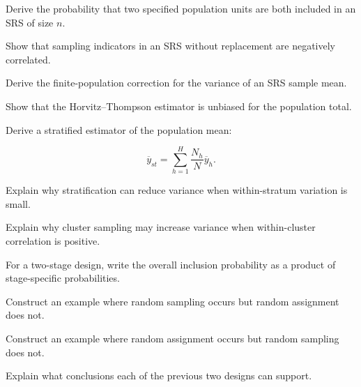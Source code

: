 \begin{exercise}[3]
Derive the probability that two specified population units are both
included in an SRS of size \(n\).
\end{exercise}

\begin{exercise}[3]
Show that sampling indicators in an SRS without replacement are
negatively correlated.
\end{exercise}

\begin{exercise}[3]
Derive the finite-population correction for the variance of an SRS sample
mean.
\end{exercise}

\begin{exercise}[3]
Show that the Horvitz--Thompson estimator is unbiased for the population
total.
\end{exercise}

\begin{exercise}[3]
Derive a stratified estimator of the population mean:

\[
\overline{y}_{st}
=
\sum_{h=1}^{H}
\frac{N_h}{N}
\overline{y}_h.
\]
\end{exercise}

\begin{exercise}[3]
Explain why stratification can reduce variance when within-stratum
variation is small.
\end{exercise}

\begin{exercise}[3]
Explain why cluster sampling may increase variance when within-cluster
correlation is positive.
\end{exercise}

\begin{exercise}[3]
For a two-stage design, write the overall inclusion probability as a
product of stage-specific probabilities.
\end{exercise}

\begin{exercise}[3]
Construct an example where random sampling occurs but random assignment
does not.
\end{exercise}

\begin{exercise}[3]
Construct an example where random assignment occurs but random sampling
does not.
\end{exercise}

\begin{exercise}[3]
Explain what conclusions each of the previous two designs can support.
\end{exercise}

